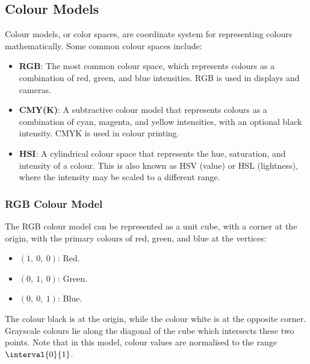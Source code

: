 \documentclass{article}
\begin{document}
\subsection{Colour Models}
Colour models, or color spaces, are coordinate system for representing
colours mathematically. Some common colour spaces include:
\begin{itemize}
    \item \textbf{RGB}: The most common colour space, which represents
          colours as a combination of red, green, and blue intensities.
          RGB is used in displays and cameras.
    \item \textbf{CMY(K)}: A subtractive colour model that represents
            colours as a combination of cyan, magenta, and yellow
            intensities, with an optional black intensity.
            CMYK is used in colour printing.
    \item \textbf{HSI}: A cylindrical colour space that represents
    the hue, saturation, and intensity of a colour. This is also known
    as HSV (value) or HSL (lightness), where the intensity may be scaled
    to a different range.
\end{itemize}
\subsubsection{RGB Colour Model}
The RGB colour model can be represented as a unit cube, with a corner at
the origin, with the primary colours of red, green, and blue at the
vertices:
\begin{itemize}
    \item \(\left( 1,\: 0,\: 0 \right)\): Red.
    \item \(\left( 0,\: 1,\: 0 \right)\): Green.
    \item \(\left( 0,\: 0,\: 1 \right)\): Blue.
\end{itemize}
The colour black is at the origin, while the colour white is at the
opposite corner. Grayscale colours lie along the diagonal of the cube
which intersects these two points. Note that in this model, colour
values are normalised to the range \(\interval{0}{1}\).
\end{document}
